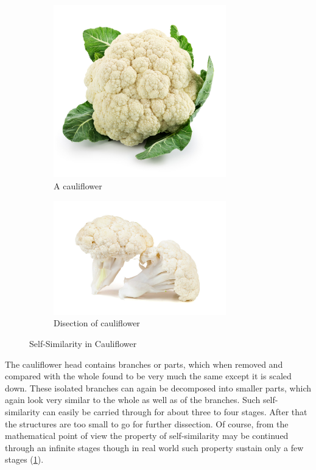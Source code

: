 	\begin{figure}
		\centering
		\captionsetup[subfigure]{width=0.9\textwidth}
		\begin{subfigure}[t]{.45\textwidth}
			\centering
			\includegraphics[width=7.5cm]{self-similarity/cauliflower.jpg}
			\caption{A cauliflower}
		\end{subfigure}
		\begin{subfigure}[t]{.45\textwidth}
			\centering
			\includegraphics[width=7.5cm]{self-similarity/cauliflower_disected}
			\caption{Disection of cauliflower}
		\end{subfigure}
		\caption{Self-Similarity in Cauliflower}
		\label{fig:cauliflower-self-similarity}
	\end{figure}
	
	The cauliflower head contains branches or parts, which	when removed and compared with the whole found to be very much	the same except it is scaled down. These isolated branches can again	be decomposed into smaller parts, which again look very similar to the	whole as well as of the branches. Such self-similarity can easily be carried through for about three to four stages. After that the structures are	too small to go for further dissection. Of course, from the mathematical	point of view the property of self-similarity may be continued through	an infinite stages though in real world such property sustain only a few	stages (\ref{fig:cauliflower-self-similarity}).
	
